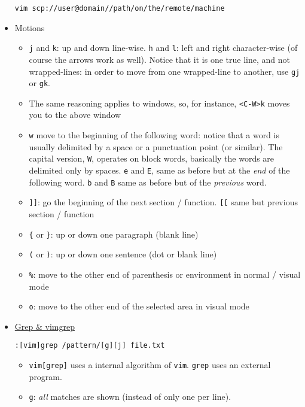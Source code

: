 \documentclass[a4paper,12pt,%
              final%
              ]{article}
\begin{document}
\begin{itemize}
\begin{verbatim}
vim scp://user@domain//path/on/the/remote/machine
\end{verbatim}
  \item Motions
    \begin{itemize}
      \item \texttt{j} and \texttt{k}: up and down line-wise. \texttt{h} and
        \texttt{l}: left and right character-wise (of course the arrows work as
        well). Notice that it is one true line, and not wrapped-lines: in order to
        move from one wrapped-line to another, use \texttt{gj} or \texttt{gk}.
      \item The same reasoning applies to windows, so, for instance, \verb|<C-W>k|
        moves you to the above window
      \item \texttt{w} move to the beginning of the following word: notice that a
        word is usually delimited by a space or a punctuation point (or similar). The
        capital version, \texttt{W}, operates on block words, basically the words are
        delimited only by spaces. \texttt{e} and \texttt{E}, same as before but at
        the \emph{end} of the following word. \texttt{b} and \texttt{B} same as
        before but of the \emph{previous} word.
      \item \texttt{]]}: go the beginning of the next section / function. \texttt{[[}
        same but previous section / function
      \item \verb|{| or \verb|}|: up or down one paragraph (blank line)
      \item \verb|(| or \verb|)|: up or down one sentence (dot or blank line)
      \item \verb|%|: move to the other end of parenthesis or environment in normal / visual mode
      \item \verb|o|: move to the other end of the selected area in visual mode
    \end{itemize}
  \item \href{https://vim.fandom.com/wiki/Find_in_files_within_Vim}{Grep \& vimgrep}
\begin{verbatim}
:[vim]grep /pattern/[g][j] file.txt
\end{verbatim}
    \begin{itemize}
      \item \texttt{vim[grep]} uses a internal algorithm of \texttt{vim}.
        \texttt{grep} uses an external program.
      \item \texttt{g}: \emph{all} matches are shown (instead of only one per line).

\end{itemize}
\end{itemize}
\end{document}
